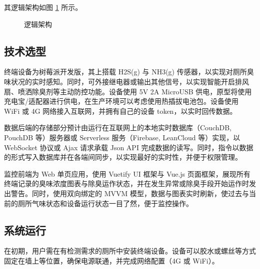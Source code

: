 \documentclass[UTF8]{ctexart}
\begin{document}
其逻辑架构如图 \ref{fig:diagram} 所示。
\begin{figure}[htbp]
    \noindent{}
    \caption{逻辑架构}\label{fig:diagram}
\end{figure}
\subsection{技术选型}
终端设备为树莓派开发版，其上搭载 H2S(g) 与 NH3(g) 传感器，以实现对厕所臭味状况的实时感知。同时，可外接继电器或输出其他信号，以实现智能开启排风扇、喷洒除臭剂等主动防控功能。设备使用 5V 2A MicroUSB 供电，原型将使用充电宝/适配器进行供电，在生产环境可以考虑使用热插拔电池包。设备使用 WiFi 或 4G 网络接入互联网，并拥有自己的设备 token，以实时回传数据。

数据后端的存储部分预计由运行在互联网上的本地实时数据库（Couch\-DB, PouchDB 等）服务器或 Serverless 服务（Firebase, LeanCloud 等）实现，以 WebSocket 协议或 Ajax 请求承载 Json API 完成数据的读写。同时，指令以数据的形式写入数据库并在各端间同步，以实现最好的实时性，并便于权限管理。

监控前端为 Web 单页应用，使用 Vuetify UI 框架与 Vue.js 页面框架，展现所有终端记录的臭味浓度图表与除臭运作状态，并在发生异常或除臭手段开始运作时发出警告。同时，使用双向绑定的 MVVM 模型，数据与图表实时刷新，使过去与当前的厕所气味状态和设备运行状态一目了然，便于监控操作。
\subsection{系统运行}
在初期，用户需在有检测需求的厕所中安装终端设备。设备可以胶水或螺丝等方式固定在墙上等位置，确保电源联通，并完成网络配置（4G 或 WiFi）。
\end{document}
